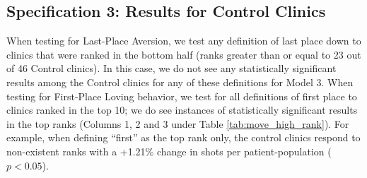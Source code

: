 \begin{table}[!b]
 \end{table}

\subsection{Specification 3: Results for Control Clinics}
When testing for Last-Place Aversion, we test any definition of last place down to clinics that were ranked in the bottom half (ranks greater than or equal to 23 out of 46 Control clinics). In this case, we do not see any statistically significant results among the Control clinics for any of these definitions for Model 3. When testing for First-Place Loving behavior, we test for all definitions of first place to clinics ranked in the top 10; we do see instances of statistically significant results in the top ranks (Columns 1, 2 and 3 under Table \ref{tab:move_high_rank}). For example, when defining “first” as the top rank only, the control clinics respond to non-existent ranks with a +1.21\% change in shots per patient-population ($p < 0.05$). 

